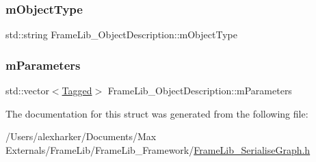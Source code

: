 \subsubsection{\texorpdfstring{m\+Object\+Type}{mObjectType}}
{\footnotesize\ttfamily std\+::string Frame\+Lib\+\_\+\+Object\+Description\+::m\+Object\+Type}

\mbox{\label{struct_frame_lib___object_description_a45297bfeb12aa74520edaddfd03fc12c}} 
\subsubsection{\texorpdfstring{m\+Parameters}{mParameters}}
{\footnotesize\ttfamily std\+::vector$<$\hyperlink{struct_frame_lib___object_description_1_1_tagged}{Tagged}$>$ Frame\+Lib\+\_\+\+Object\+Description\+::m\+Parameters}



The documentation for this struct was generated from the following file\+:\begin{DoxyCompactItemize}
\item 
/\+Users/alexharker/\+Documents/\+Max Externals/\+Frame\+Lib/\+Frame\+Lib\+\_\+\+Framework/\hyperlink{_frame_lib___serialise_graph_8h}{Frame\+Lib\+\_\+\+Serialise\+Graph.\+h}\end{DoxyCompactItemize}
